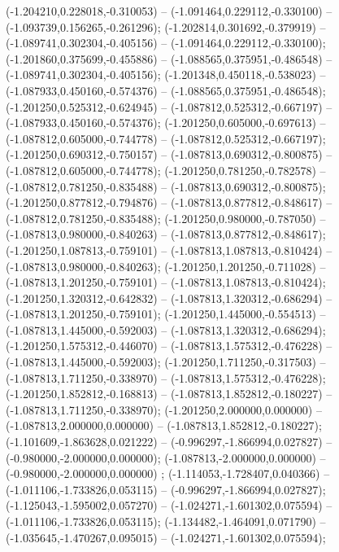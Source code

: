  (-1.204210,0.228018,-0.310053) -- (-1.091464,0.229112,-0.330100) -- (-1.093739,0.156265,-0.261296);
 (-1.202814,0.301692,-0.379919) -- (-1.089741,0.302304,-0.405156) -- (-1.091464,0.229112,-0.330100);
 (-1.201860,0.375699,-0.455886) -- (-1.088565,0.375951,-0.486548) -- (-1.089741,0.302304,-0.405156);
 (-1.201348,0.450118,-0.538023) -- (-1.087933,0.450160,-0.574376) -- (-1.088565,0.375951,-0.486548);
 (-1.201250,0.525312,-0.624945) -- (-1.087812,0.525312,-0.667197) -- (-1.087933,0.450160,-0.574376);
 (-1.201250,0.605000,-0.697613) -- (-1.087812,0.605000,-0.744778) -- (-1.087812,0.525312,-0.667197);
 (-1.201250,0.690312,-0.750157) -- (-1.087813,0.690312,-0.800875) -- (-1.087812,0.605000,-0.744778);
 (-1.201250,0.781250,-0.782578) -- (-1.087812,0.781250,-0.835488) -- (-1.087813,0.690312,-0.800875);
 (-1.201250,0.877812,-0.794876) -- (-1.087813,0.877812,-0.848617) -- (-1.087812,0.781250,-0.835488);
 (-1.201250,0.980000,-0.787050) -- (-1.087813,0.980000,-0.840263) -- (-1.087813,0.877812,-0.848617);
 (-1.201250,1.087813,-0.759101) -- (-1.087813,1.087813,-0.810424) -- (-1.087813,0.980000,-0.840263);
 (-1.201250,1.201250,-0.711028) -- (-1.087813,1.201250,-0.759101) -- (-1.087813,1.087813,-0.810424);
 (-1.201250,1.320312,-0.642832) -- (-1.087813,1.320312,-0.686294) -- (-1.087813,1.201250,-0.759101);
 (-1.201250,1.445000,-0.554513) -- (-1.087813,1.445000,-0.592003) -- (-1.087813,1.320312,-0.686294);
 (-1.201250,1.575312,-0.446070) -- (-1.087813,1.575312,-0.476228) -- (-1.087813,1.445000,-0.592003);
 (-1.201250,1.711250,-0.317503) -- (-1.087813,1.711250,-0.338970) -- (-1.087813,1.575312,-0.476228);
 (-1.201250,1.852812,-0.168813) -- (-1.087813,1.852812,-0.180227) -- (-1.087813,1.711250,-0.338970);
 (-1.201250,2.000000,0.000000) -- (-1.087813,2.000000,0.000000) -- (-1.087813,1.852812,-0.180227);
 (-1.101609,-1.863628,0.021222) -- (-0.996297,-1.866994,0.027827) -- (-0.980000,-2.000000,0.000000);
 (-1.087813,-2.000000,0.000000) -- (-0.980000,-2.000000,0.000000) ;
 (-1.114053,-1.728407,0.040366) -- (-1.011106,-1.733826,0.053115) -- (-0.996297,-1.866994,0.027827);
 (-1.125043,-1.595002,0.057270) -- (-1.024271,-1.601302,0.075594) -- (-1.011106,-1.733826,0.053115);
 (-1.134482,-1.464091,0.071790) -- (-1.035645,-1.470267,0.095015) -- (-1.024271,-1.601302,0.075594);
